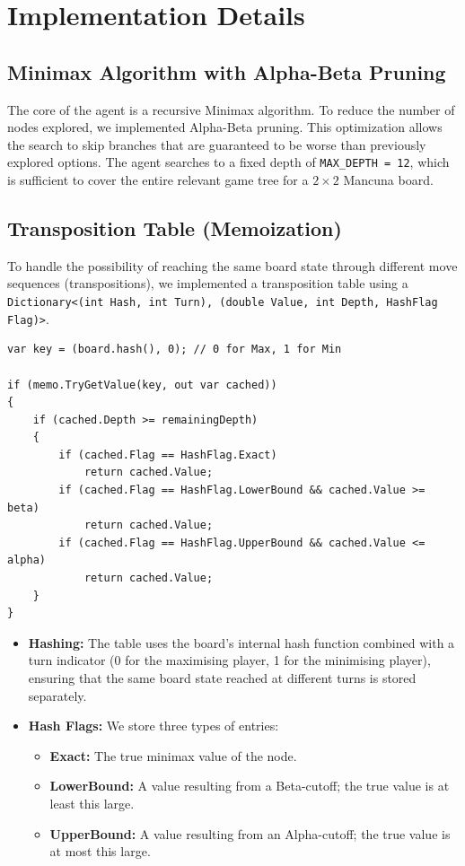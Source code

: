 \documentclass[12pt,a4paper]{article}
\begin{document}
\section{Implementation Details}

\subsection{Minimax Algorithm with Alpha-Beta Pruning}
The core of the agent is a recursive Minimax algorithm. To reduce the number of nodes explored, we implemented Alpha-Beta pruning. This optimization allows the search to skip branches that are guaranteed to be worse than previously explored options. The agent searches to a fixed depth of \texttt{MAX\_DEPTH = 12}, which is sufficient to cover the entire relevant game tree for a $2 \times 2$ Mancuna board.

\subsection{Transposition Table (Memoization)}
To handle the possibility of reaching the same board state through different move sequences (transpositions), we implemented a transposition table using a \texttt{Dictionary<(int Hash, int Turn), (double Value, int Depth, HashFlag Flag)>}.

\begin{lstlisting}[language={[Sharp]C}, caption=Transposition Table Lookup Implementation]
var key = (board.hash(), 0); // 0 for Max, 1 for Min

if (memo.TryGetValue(key, out var cached))
{
    if (cached.Depth >= remainingDepth)
    {
        if (cached.Flag == HashFlag.Exact)
            return cached.Value;
        if (cached.Flag == HashFlag.LowerBound && cached.Value >= beta)
            return cached.Value;
        if (cached.Flag == HashFlag.UpperBound && cached.Value <= alpha)
            return cached.Value;
    }
}
\end{lstlisting}

\begin{itemize}
    \item \textbf{Hashing:} The table uses the board's internal hash function combined with a turn indicator (0 for the maximising player, 1 for the minimising player), ensuring that the same board state reached at different turns is stored separately.
    \item \textbf{Hash Flags:} We store three types of entries:
    \begin{itemize}
        \item \textbf{Exact:} The true minimax value of the node.
        \item \textbf{LowerBound:} A value resulting from a Beta-cutoff; the true value is at least this large.
        \item \textbf{UpperBound:} A value resulting from an Alpha-cutoff; the true value is at most this large.
    \end{itemize}
\end{itemize}
\end{document}
